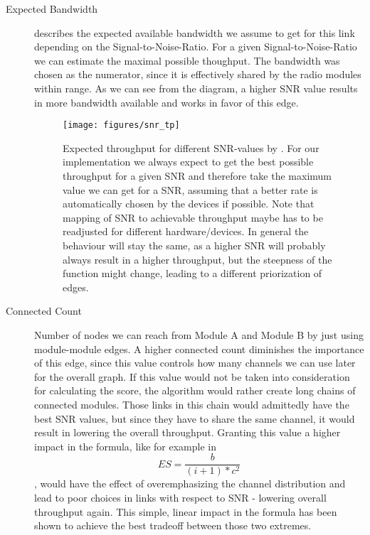   \begin{description}
    \item[Expected Bandwidth]
    describes the expected available bandwidth we assume to get for this link depending on the Signal-to-Noise-Ratio.
    For a given Signal-to-Noise-Ratio we can estimate the maximal possible thoughput.
    The bandwidth was chosen as the numerator, since it is effectively shared by the radio modules within range.
    As we can see from the diagram, a higher SNR value results in more bandwidth available and works in favor of this edge.
    \begin{figure}[h]
      \centering
      \texttt{[image: figures/snr\_tp]}
      \caption{Expected throughput for different \ac{SNR}-values by \cite{expected_snr}. For our implementation we always expect to get the best possible
      throughput for a given SNR and therefore take the maximum value we can get for a SNR, assuming that a better rate is automatically chosen by the devices if possible.
      Note that mapping of SNR to achievable throughput maybe has to be readjusted for different hardware/devices. In general the behaviour will stay the same, as 
      a higher SNR will probably always result in a higher throughput, but the steepness of the function might change, leading to a different priorization of edges.}
      \label{fig:snr_tp}
    \end{figure}
    \item[Connected Count]
    Number of nodes we can reach from Module A and Module B by just using module-module edges. 
    A higher connected count diminishes the importance of this edge, since this value controls how many channels we can use later for the overall graph.
    If this value would not be taken into consideration for calculating the score, the algorithm would rather create long chains of connected modules. 
    Those links in this chain would admittedly have the best SNR values, but since they have to share the same channel, it would result in lowering the overall throughput.
    Granting this value a higher impact in the formula, like for example in 
    \begin{equation}
      ES=\frac{b}{(i + 1)* c^2}
    \end{equation}
    , would have the effect of overemphasizing 
    the channel distribution and lead to poor choices in links with respect to SNR - lowering overall throughput again.
    This simple, linear impact in the formula has been shown to achieve the best tradeoff between those two extremes.

\end{description}
